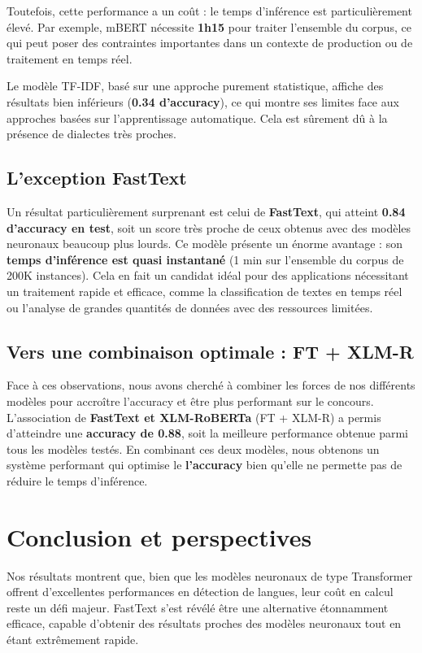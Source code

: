 Toutefois, cette performance a un coût : le temps d'inférence est particulièrement élevé. Par exemple, mBERT nécessite \textbf{1h15} pour traiter l'ensemble du corpus, ce qui peut poser des contraintes importantes dans un contexte de production ou de traitement en temps réel.

Le modèle TF-IDF, basé sur une approche purement statistique, affiche des résultats bien inférieurs (\textbf{0.34 d’accuracy}), ce qui montre ses limites face aux approches basées sur l’apprentissage automatique. Cela est sûrement dû à la présence de dialectes très proches.

\subsection{L'exception FastText}

Un résultat particulièrement surprenant est celui de \textbf{FastText}, qui atteint \textbf{0.84 d'accuracy en test}, soit un score très proche de ceux obtenus avec des modèles neuronaux beaucoup plus lourds. Ce modèle présente un énorme avantage : son \textbf{temps d'inférence est quasi instantané} (1 min sur l’ensemble du corpus de 200K instances). Cela en fait un candidat idéal pour des applications nécessitant un traitement rapide et efficace, comme la classification de textes en temps réel ou l’analyse de grandes quantités de données avec des ressources limitées.

\subsection{Vers une combinaison optimale : FT + XLM-R}

Face à ces observations, nous avons cherché à combiner les forces de nos différents modèles pour accroître l'accuracy et être plus performant sur le concours. L’association de \textbf{FastText et XLM-RoBERTa} (FT + XLM-R) a permis d’atteindre une \textbf{accuracy de 0.88}, soit la meilleure performance obtenue parmi tous les modèles testés.
En combinant ces deux modèles, nous obtenons un système performant qui optimise le \textbf{l'accuracy} bien qu'elle ne permette pas de réduire le temps d'inférence.

\section{Conclusion et perspectives}

Nos résultats montrent que, bien que les modèles neuronaux de type Transformer offrent d’excellentes performances en détection de langues, leur coût en calcul reste un défi majeur. FastText s’est révélé être une alternative étonnamment efficace, capable d’obtenir des résultats proches des modèles neuronaux tout en étant extrêmement rapide.


